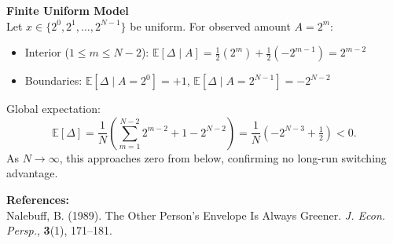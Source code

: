 \begin{technical}
\textbf{Finite Uniform Model}\\[0.2em]
Let $x \in \{2^0, 2^1, \dots, 2^{N-1}\}$ be uniform. For observed amount $A = 2^m$:
\begin{itemize}[topsep=0pt,itemsep=2pt]
\item Interior ($1 \le m \le N - 2$): $\mathbb{E}[\Delta \mid A] = \tfrac{1}{2}(2^m) + \tfrac{1}{2}(-2^{m-1}) = 2^{m-2}$
\item Boundaries: $\mathbb{E}[\Delta \mid A = 2^0] = +1$, $\mathbb{E}[\Delta \mid A = 2^{N-1}] = -2^{N-2}$
\end{itemize}
Global expectation:
\[
\mathbb{E}[\Delta] = \frac{1}{N} \left( \sum_{m=1}^{N-2} 2^{m-2} + 1 - 2^{N-2} \right) = \frac{1}{N} \left( -2^{N-3} + \tfrac{1}{2} \right) < 0.
\]
As $N \to \infty$, this approaches zero from below, confirming no long-run switching advantage.

\textbf{References:}\\
Nalebuff, B. (1989). The Other Person's Envelope Is Always Greener. \textit{J. Econ. Persp.}, \textbf{3}(1), 171--181.
\end{technical}
